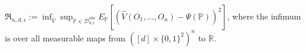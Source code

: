 \(\mathfrak R_{n,d,\epsilon}:=\inf_{\widehat V}\sup_{\mathbb P\in\mathcal D_{d,\epsilon}^{\mathrm{obs}}}E_{\mathbb P}[(\widehat V(O_1,\ldots,O_n)-\Psi(\mathbb P))^2]\), where the infimum is over all measurable maps from \(([d]\times\{0,1\}^2)^n\) to \(\mathbb R\).